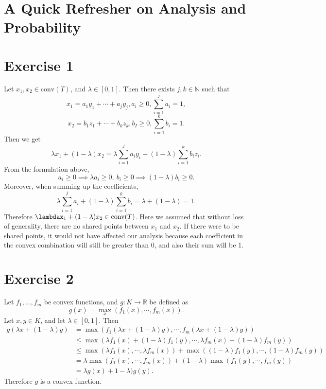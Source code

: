 \section{A Quick Refresher on Analysis and Probability}

\section*{Exercise 1}
Let $x_1, x_2 \in \text{conv}(T)$, and $\lambda \in [0, 1]$. Then there exists $j, k \in \mathbb{N}$ such that 
\[ x_1 = a_1 y_1 + \cdots + a_j y_j, a_i \geq 0, \sum_{i = 1}^{j} a_i = 1, \]
\[ x_2 = b_1 z_1 + \cdots + b_k z_k, b_I \geq 0, \sum_{i = 1}^{k} b_i = 1. \]
Then we get 
\[ \lambda x_1 + (1 - \lambda) x_2 
= \lambda \sum_{i = 1}^{j} a_i y_i + (1 - \lambda)\sum_{i = 1}^{k} b_i z_i. \]
From the formulation above, 
\[ a_i \geq 0 \implies \lambda a_i \geq 0, \ b_i \geq 0 \implies (1 - \lambda) b_i \geq 0. \]
Moreover, when summing up the coefficients, 
\[ \lambda \sum_{i = 1}^{j} a_i + (1 - \lambda) \sum_{i = 1}^{k} b_i = \lambda + (1 - \lambda) = 1. \]
Therefore $\lambdax_1 + (1 - \lambda)x_2 \in \text{conv}(T)$. Here we assumed that without loss of generality, 
there are no shared 
points between $x_1$ and $x_2$. If there were to be shared points, it would not have affected our analysis 
because each coefficient 
in the convex combination will still be greater than 0, and also their sum will be 1.


\newpage
\section*{Exercise 2}
Let $f_1, \dots, f_m$ be convex functions, and $g: K \to \mathbb{R}$ be defined as 
\[ g(x) = \max_{x}(f_1(x), \cdots, f_m(x)). \]
Let $x, y \in K$, and let $\lambda \in [0, 1]$. Then 
\begin{align*}
	g(\lambda x + (1 - \lambda)y) 
	&= \max_{}(f_1(\lambda x + (1 - \lambda)y), \cdots, f_m(\lambda x + (1 - \lambda)y)) \\
	&\leq \max_{}(\lambda f_1(x) + (1 - \lambda)f_1(y), \cdots, \lambda f_m(x) + (1 - \lambda) f_m(y)) \\
	&\leq \max_{}(\lambda f_1(x), \cdots, \lambda f_m(x)) + \max_{}((1 - \lambda)f_1(y), \cdots, (1 - \lambda)f_m(y)) \\
	&= \lambda \max_{}(f_1(x), \cdots, f_m(x)) + (1 - \lambda) \max_{}(f_1(y), \cdots, f_m(y)) \\
	&= \lambda g(x) + 1 - \lambda) g(y).
\end{align*}
Therefore $g$ is a convex function.


